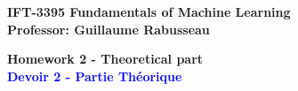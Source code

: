 \documentclass[11pt,french,english]{article}
\begin{document}
\setlength{\parskip}{0.3cm} \setlength{\parindent}{0cm}

\begin{center}
\textbf{IFT-3395 Fundamentals of Machine Learning} \\
\textbf{Professor: Guillaume Rabusseau }
\par\end{center}{\large \par}

\begin{center}
\textbf{\LARGE{Homework 2 - Theoretical part}} \\
\textbf{\textcolor{blue}{Devoir 2 - Partie Th\'eorique}}
\par\end{center}{\LARGE \par}


%


%


%
\end{document}
